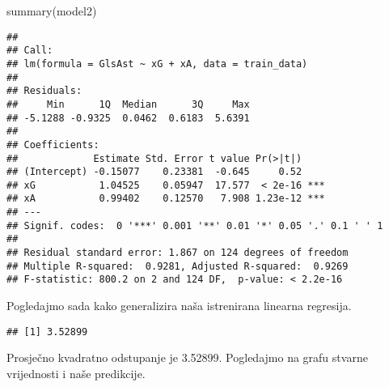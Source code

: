 \documentclass[
]{article}
\newenvironment{Shaded}{\begin{snugshade}}{\end{snugshade}}
\newcommand{\AttributeTok}[1]{\textcolor[rgb]{0.77,0.63,0.00}{#1}}
\newcommand{\DecValTok}[1]{\textcolor[rgb]{0.00,0.00,0.81}{#1}}
\newcommand{\FunctionTok}[1]{\textcolor[rgb]{0.00,0.00,0.00}{#1}}
\newcommand{\NormalTok}[1]{#1}
\newcommand{\OtherTok}[1]{\textcolor[rgb]{0.56,0.35,0.01}{#1}}
\newcommand{\SpecialCharTok}[1]{\textcolor[rgb]{0.00,0.00,0.00}{#1}}
\begin{document}
\begin{Shaded}
\begin{Highlighting}[]
\FunctionTok{summary}\NormalTok{(model2)}
\end{Highlighting}
\end{Shaded}

\begin{verbatim}
## 
## Call:
## lm(formula = GlsAst ~ xG + xA, data = train_data)
## 
## Residuals:
##     Min      1Q  Median      3Q     Max 
## -5.1288 -0.9325  0.0462  0.6183  5.6391 
## 
## Coefficients:
##             Estimate Std. Error t value Pr(>|t|)    
## (Intercept) -0.15077    0.23381  -0.645     0.52    
## xG           1.04525    0.05947  17.577  < 2e-16 ***
## xA           0.99402    0.12570   7.908 1.23e-12 ***
## ---
## Signif. codes:  0 '***' 0.001 '**' 0.01 '*' 0.05 '.' 0.1 ' ' 1
## 
## Residual standard error: 1.867 on 124 degrees of freedom
## Multiple R-squared:  0.9281, Adjusted R-squared:  0.9269 
## F-statistic: 800.2 on 2 and 124 DF,  p-value: < 2.2e-16
\end{verbatim}

Pogledajmo sada kako generalizira naša istrenirana linearna regresija.

\begin{Shaded}
\end{Shaded}

\begin{verbatim}
## [1] 3.52899
\end{verbatim}

Prosječno kvadratno odstupanje je 3.52899. Pogledajmo na grafu stvarne
vrijednosti i naše predikcije.

\begin{Shaded}
\end{Shaded}
\end{document}
